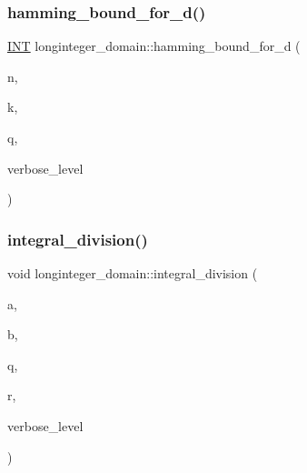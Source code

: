 \mbox{\label{classlonginteger__domain_a8286a3807d17fc93efa298fe34b5428b}} 
\subsubsection{\texorpdfstring{hamming\+\_\+bound\+\_\+for\+\_\+d()}{hamming\_bound\_for\_d()}}
{\footnotesize\ttfamily \mbox{\hyperlink{galois_8h_a09fddde158a3a20bd2dcadb609de11dc}{I\+NT}} longinteger\+\_\+domain\+::hamming\+\_\+bound\+\_\+for\+\_\+d (\begin{DoxyParamCaption}\item[{\mbox{\hyperlink{galois_8h_a09fddde158a3a20bd2dcadb609de11dc}{I\+NT}}}]{n,  }\item[{\mbox{\hyperlink{galois_8h_a09fddde158a3a20bd2dcadb609de11dc}{I\+NT}}}]{k,  }\item[{\mbox{\hyperlink{galois_8h_a09fddde158a3a20bd2dcadb609de11dc}{I\+NT}}}]{q,  }\item[{\mbox{\hyperlink{galois_8h_a09fddde158a3a20bd2dcadb609de11dc}{I\+NT}}}]{verbose\+\_\+level }\end{DoxyParamCaption})}

\mbox{\label{classlonginteger__domain_a1ecbac0518646945d9633a86844846aa}} 
\subsubsection{\texorpdfstring{integral\+\_\+division()}{integral\_division()}}
{\footnotesize\ttfamily void longinteger\+\_\+domain\+::integral\+\_\+division (\begin{DoxyParamCaption}\item[{\mbox{\hyperlink{classlonginteger__object}{longinteger\+\_\+object}} \&}]{a,  }\item[{\mbox{\hyperlink{classlonginteger__object}{longinteger\+\_\+object}} \&}]{b,  }\item[{\mbox{\hyperlink{classlonginteger__object}{longinteger\+\_\+object}} \&}]{q,  }\item[{\mbox{\hyperlink{classlonginteger__object}{longinteger\+\_\+object}} \&}]{r,  }\item[{\mbox{\hyperlink{galois_8h_a09fddde158a3a20bd2dcadb609de11dc}{I\+NT}}}]{verbose\+\_\+level }\end{DoxyParamCaption})}

